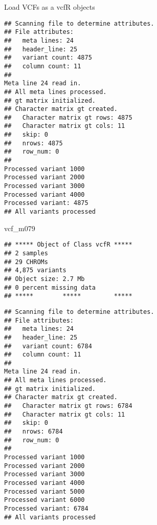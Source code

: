 \documentclass[]{article}
\newenvironment{Shaded}{\begin{snugshade}}{\end{snugshade}}
\newcommand{\DataTypeTok}[1]{\textcolor[rgb]{0.13,0.29,0.53}{#1}}
\newcommand{\KeywordTok}[1]{\textcolor[rgb]{0.13,0.29,0.53}{\textbf{#1}}}
\newcommand{\NormalTok}[1]{#1}
\newcommand{\OperatorTok}[1]{\textcolor[rgb]{0.81,0.36,0.00}{\textbf{#1}}}
\newcommand{\StringTok}[1]{\textcolor[rgb]{0.31,0.60,0.02}{#1}}
\begin{document}
Load VCFs as a vcfR objects

\begin{Shaded}
\end{Shaded}

\begin{verbatim}
## Scanning file to determine attributes.
## File attributes:
##   meta lines: 24
##   header_line: 25
##   variant count: 4875
##   column count: 11
## 
Meta line 24 read in.
## All meta lines processed.
## gt matrix initialized.
## Character matrix gt created.
##   Character matrix gt rows: 4875
##   Character matrix gt cols: 11
##   skip: 0
##   nrows: 4875
##   row_num: 0
## 
Processed variant 1000
Processed variant 2000
Processed variant 3000
Processed variant 4000
Processed variant: 4875
## All variants processed
\end{verbatim}

\begin{Shaded}
\begin{Highlighting}[]
\NormalTok{vcf_m079}
\end{Highlighting}
\end{Shaded}

\begin{verbatim}
## ***** Object of Class vcfR *****
## 2 samples
## 29 CHROMs
## 4,875 variants
## Object size: 2.7 Mb
## 0 percent missing data
## *****        *****         *****
\end{verbatim}

\begin{Shaded}
\end{Shaded}

\begin{verbatim}
## Scanning file to determine attributes.
## File attributes:
##   meta lines: 24
##   header_line: 25
##   variant count: 6784
##   column count: 11
## 
Meta line 24 read in.
## All meta lines processed.
## gt matrix initialized.
## Character matrix gt created.
##   Character matrix gt rows: 6784
##   Character matrix gt cols: 11
##   skip: 0
##   nrows: 6784
##   row_num: 0
## 
Processed variant 1000
Processed variant 2000
Processed variant 3000
Processed variant 4000
Processed variant 5000
Processed variant 6000
Processed variant: 6784
## All variants processed
\end{verbatim}
\end{document}
